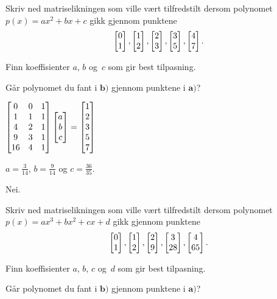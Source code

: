 \begin{oppgave}
\begin{punkt}
Skriv ned matriselikningen som ville vært tilfredstilt dersom polynomet $p(x)=ax^2+bx+c$ gikk gjennom punktene
$$\begin{bmatrix} 0 \\ 1 \end{bmatrix}, \begin{bmatrix} 1 \\ 2 \end{bmatrix}, \begin{bmatrix} 2 \\ 3 \end{bmatrix},\begin{bmatrix} 3 \\ 5 \end{bmatrix},\begin{bmatrix} 4 \\ 7 \end{bmatrix}.$$
\end{punkt}
\begin{punkt}
Finn koeffisienter $a$, $b$ og~$c$ som gir best tilpasning.
\end{punkt}

\begin{punkt}
Går polynomet du fant i $\textbf{b)}$ gjennom punktene i $\textbf{a)}$?
\end{punkt}

\end{oppgave}

\begin{losning}
\begin{punkt}
$
\begin{bmatrix}
0 & 0 & 1\\
1 & 1 & 1\\
4 & 2 & 1\\
9 & 3 & 1\\
16 & 4 & 1
\end{bmatrix}\begin{bmatrix} a \\ b \\ c \end{bmatrix}=\begin{bmatrix}
1\\
2\\
3\\
5\\
7
\end{bmatrix}$
\end{punkt}

\begin{punkt}
$a=\frac{3}{14}$, $b=\frac{9}{14}$ og $c=\frac{36}{35}$.
\end{punkt}

\begin{punkt}
Nei.
\end{punkt}

\end{losning}


\begin{oppgave}

\begin{punkt}
Skriv ned matriselikningen som ville vært tilfredstilt dersom polynomet $p(x)=ax^3+bx^2+cx+d$ gikk gjennom punktene
$$\begin{bmatrix} 0 \\ 1 \end{bmatrix}, \begin{bmatrix} 1 \\ 2 \end{bmatrix}, \begin{bmatrix} 2 \\ 9 \end{bmatrix},\begin{bmatrix} 3 \\ 28 \end{bmatrix},\begin{bmatrix} 4 \\ 65 \end{bmatrix}.$$ 
\end{punkt}


\begin{punkt}
Finn koeffisienter $a$, $b$, $c$ og~$d$ som gir best tilpasning.
\end{punkt}

\begin{punkt}
Går polynomet du fant i $\textbf{b)}$ gjennom punktene i $\textbf{a)}$?
\end{punkt}

\end{oppgave}

